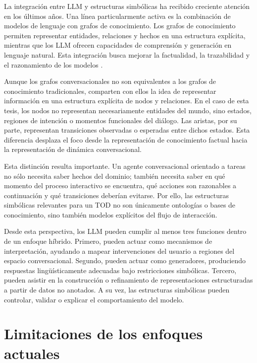 La integración entre \ac{LLM} y estructuras simbólicas ha recibido creciente atención
en los últimos años. Una línea particularmente activa es la combinación de modelos de
lenguaje con grafos de conocimiento. Los grafos de conocimiento permiten representar
entidades, relaciones y hechos en una estructura explícita, mientras que los \ac{LLM}
ofrecen capacidades de comprensión y generación en lenguaje natural. Esta integración
busca mejorar la factualidad, la trazabilidad y el razonamiento de los modelos
\citep{ji2022survey,pan2024unifying,luo2024reasoning}.

Aunque los grafos conversacionales no son equivalentes a los grafos de conocimiento
tradicionales, comparten con ellos la idea de representar información en una estructura
explícita de nodos y relaciones. En el caso de esta tesis, los nodos no representan
necesariamente entidades del mundo, sino estados, regiones de intención o momentos
funcionales del diálogo. Las aristas, por su parte, representan transiciones observadas
o esperadas entre dichos estados. Esta diferencia desplaza el foco desde la representación
de conocimiento factual hacia la representación de dinámica conversacional.

Esta distinción resulta importante. Un agente conversacional orientado a tareas no sólo
necesita saber hechos del dominio; también necesita saber en qué momento del proceso
interactivo se encuentra, qué acciones son razonables a continuación y qué transiciones
deberían evitarse. Por ello, las estructuras simbólicas relevantes para un \ac{TOD} no
son únicamente ontologías o bases de conocimiento, sino también modelos explícitos
del flujo de interacción.

Desde esta perspectiva, los \ac{LLM} pueden cumplir al menos tres funciones dentro de
un enfoque híbrido. Primero, pueden actuar como mecanismos de interpretación,
ayudando a mapear intervenciones del usuario a regiones del espacio conversacional.
Segundo, pueden actuar como generadores, produciendo respuestas lingüísticamente
adecuadas bajo restricciones simbólicas. Tercero, pueden asistir en la construcción o
refinamiento de representaciones estructuradas a partir de datos no anotados. A su
vez, las estructuras simbólicas pueden controlar, validar o explicar el comportamiento
del modelo.

\section{Limitaciones de los enfoques actuales}

